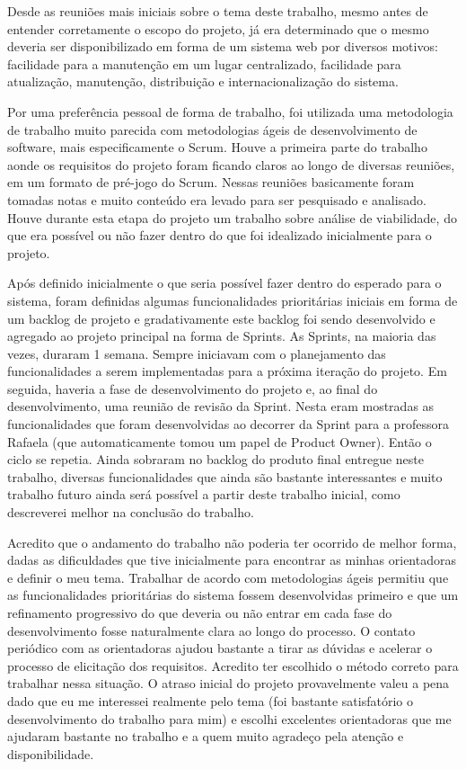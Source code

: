 \documentclass{abnt}
\begin{document}
Desde as reuniões mais iniciais sobre o tema deste trabalho, mesmo antes de entender
corretamente o escopo do projeto, já era determinado que o mesmo deveria ser disponibilizado
em forma de um sistema web por diversos motivos: facilidade para a manutenção em
um lugar centralizado, facilidade para atualização, manutenção, distribuição e internacionalização
do sistema.

Por uma preferência pessoal de forma de trabalho, foi utilizada uma metodologia
de trabalho muito parecida com metodologias ágeis de desenvolvimento de software,
mais especificamente o Scrum. Houve a primeira parte do trabalho aonde os requisitos
do projeto foram ficando claros ao longo de diversas reuniões, em um formato de
pré-jogo do Scrum. Nessas reuniões basicamente foram tomadas notas e muito conteúdo
era levado para ser pesquisado e analisado. Houve durante esta etapa do projeto
um trabalho sobre análise de viabilidade, do que era possível ou não fazer dentro
do que foi idealizado inicialmente para o projeto.

Após definido inicialmente o que seria possível fazer dentro do esperado para o
sistema, foram definidas algumas funcionalidades prioritárias iniciais em forma
de um backlog de projeto e gradativamente este backlog foi sendo desenvolvido e
agregado ao projeto principal na forma de Sprints. As Sprints, na maioria das vezes,
duraram 1 semana. Sempre iniciavam com o planejamento das funcionalidades a serem
implementadas para a próxima iteração do projeto. Em seguida, haveria a fase de
desenvolvimento do projeto e, ao final do desenvolvimento, uma reunião de revisão
da Sprint. Nesta eram mostradas as funcionalidades que foram desenvolvidas ao decorrer
da Sprint para a professora Rafaela (que automaticamente tomou um papel de Product
Owner). Então o ciclo se repetia. Ainda sobraram no backlog do produto final entregue
neste trabalho, diversas funcionalidades que ainda são bastante interessantes e muito
trabalho futuro ainda será possível a partir deste trabalho inicial, como descreverei
melhor na conclusão do trabalho.

Acredito que o andamento do trabalho não poderia ter ocorrido de melhor forma, dadas
as dificuldades que tive inicialmente para encontrar as minhas orientadoras e definir
o meu tema. Trabalhar de acordo com metodologias ágeis permitiu que as funcionalidades
prioritárias do sistema fossem desenvolvidas primeiro e que um refinamento progressivo
do que deveria ou não entrar em cada fase do desenvolvimento fosse naturalmente clara
ao longo do processo. O contato periódico com as orientadoras ajudou bastante a
tirar as dúvidas e acelerar o processo de elicitação dos requisitos. Acredito ter
escolhido o método correto para trabalhar nessa situação. O atraso inicial do projeto
provavelmente valeu a pena dado que eu me interessei realmente pelo tema (foi bastante
satisfatório o desenvolvimento do trabalho para mim) e escolhi excelentes orientadoras
que me ajudaram bastante no trabalho e a quem muito agradeço pela atenção e disponibilidade.
\end{document}
